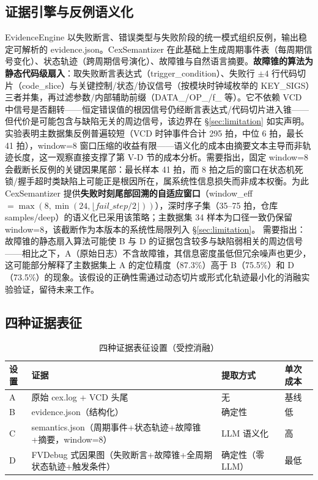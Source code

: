 \documentclass[journal]{IEEEtran}
\begin{document}
\subsection{证据引擎与反例语义化}\label{sec:evidence}

EvidenceEngine 以失败断言、错误类型与失败阶段的统一模式组织反例，输出稳定可解析的 evidence.json。CexSemantizer 在此基础上生成周期事件表（每周期信号变化）、状态轨迹（跨周期信号演化）、故障锥与自然语言摘要。\textbf{故障锥的算法为静态代码级扇入}：取失败断言表达式（trigger\_condition）、失败行 $\pm 4$ 行代码切片（code\_slice）与关键控制/状态/协议信号（按模块时钟域枚举的 KEY\_SIGS）三者并集，再过滤参数/内部辅助前缀（DATA\_/OP\_/f\_ 等）。它不依赖 VCD 中信号是否翻转——恒定错误值的根因信号仍经断言表达式/代码切片进入锥——但代价是可能包含与缺陷无关的周边信号，该边界在 \S\ref{sec:limitation} 如实声明。实验表明主数据集反例普遍较短（VCD 时钟事件合计 295 拍，中位 6 拍，最长 41 拍），window=8 窗口压缩的收益有限——语义化的成本由摘要文本主导而非轨迹长度，这一观察直接支撑了第 V-D 节的成本分析。需要指出，固定 window=8 会截断长反例的关键因果尾部：最长样本 41 拍，而 8 拍之后的窗口在状态机死锁/握手超时类缺陷上可能正是根因所在，属系统性信息损失而非成本权衡。为此 CexSemantizer 提供\textbf{失败时刻尾部回溯的自适应窗口}（window\_eff $=\max(8,\min(24,\lfloor fail\_step/2\rfloor))$），深时序子集（35--75 拍，仓库 samples/deep）的语义化已采用该策略；主数据集 34 样本为口径一致仍保留 window=8，该截断作为本版本的系统性局限列入 \S\ref{sec:limitation}。
需要指出：故障锥的静态扇入算法可能使 B 与 D 的证据包含较多与缺陷弱相关的周边信号——相比之下，A（原始日志）不含故障锥，其信息密度虽低但冗余噪声也更少，这可能部分解释了主数据集上 A 的定位精度（87.3\%）高于 B（75.5\%）和 D（73.5\%）的现象。该假设的正确性需通过动态切片或形式化轨迹最小化的消融实验验证，留待未来工作。

\subsection{四种证据表征}

\begin{table}[!t]
\centering
\caption{四种证据表征设置（受控消融）}
\label{tab:evidence}
\scriptsize
\setlength{\tabcolsep}{3pt}
\renewcommand{\arraystretch}{1.15}
\begin{tabular}{p{}p{}p{}p{}}
\toprule
\textbf{设置} & \textbf{证据} & \textbf{提取方式} & \textbf{单次成本} \\
\midrule
A & 原始 cex.log + VCD 头尾 & 无 & 基线 \\
B & evidence.json（结构化） & 确定性 & 低 \\
C & semantics.json（周期事件+状态轨迹+故障锥+摘要，window=8） & LLM 语义化 & 高 \\
D & FVDebug 式因果图（失败断言+故障锥+全周期状态轨迹+触发条件） & 确定性（零 LLM） & 最低 \\
\bottomrule
\end{tabular}
\end{table}
\end{document}
